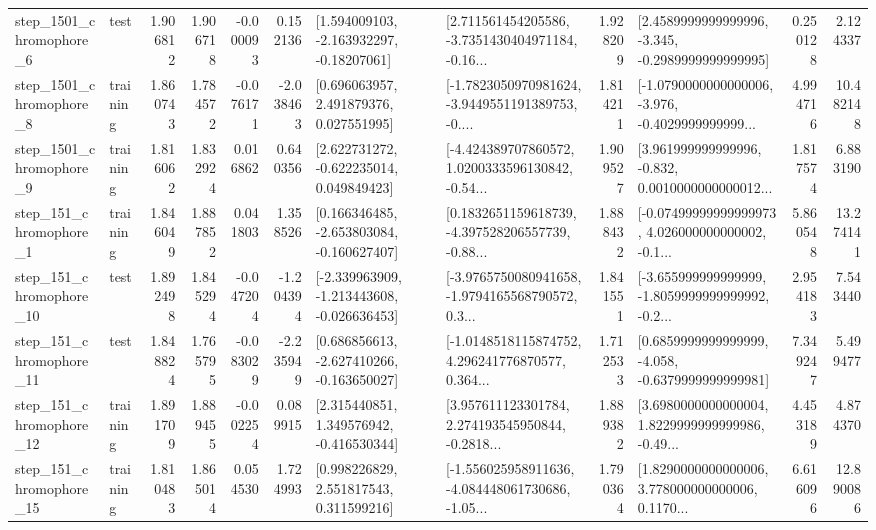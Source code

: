 \begin{tabular}{llrrrrllrlrr}
  step\_1501\_chromophore\_6 &      test &      1.906812 &    1.906718 &     -0.000093 &  0.152136 &    [1.594009103, -2.163932297, -0.18207061] &  [2.711561454205586, -3.7351430404971184, -0.16... &       1.928209 &  [2.4589999999999996, -3.345, -0.2989999999999995] &            0.250128 &          2.124337 \\
  step\_1501\_chromophore\_8 &  training &      1.860743 &    1.784572 &     -0.076171 & -2.038463 &     [0.696063957, 2.491879376, 0.027551995] &  [-1.7823050970981624, -3.9449551191389753, -0.... &       1.814211 &  [-1.0790000000000006, -3.976, -0.4029999999999... &            4.994716 &         10.482148 \\
  step\_1501\_chromophore\_9 &  training &      1.816062 &    1.832924 &      0.016862 &  0.640356 &    [2.622731272, -0.622235014, 0.049849423] &  [-4.424389707860572, 1.0200333596130842, -0.54... &       1.909527 &  [3.961999999999996, -0.832, 0.0010000000000012... &            1.817574 &          6.883190 \\
   step\_151\_chromophore\_1 &  training &      1.846049 &    1.887852 &      0.041803 &  1.358526 &   [0.166346485, -2.653803084, -0.160627407] &  [0.1832651159618739, -4.397528206557739, -0.88... &       1.888432 &  [-0.07499999999999973, 4.026000000000002, -0.1... &            5.860548 &         13.274141 \\
  step\_151\_chromophore\_10 &      test &      1.892498 &    1.845294 &     -0.047204 & -1.204394 &  [-2.339963909, -1.213443608, -0.026636453] &  [-3.9765750080941658, -1.9794165568790572, 0.3... &       1.841551 &  [-3.655999999999999, -1.8059999999999992, -0.2... &            2.954183 &          7.543440 \\
  step\_151\_chromophore\_11 &      test &      1.848824 &    1.765795 &     -0.083029 & -2.235949 &   [0.686856613, -2.627410266, -0.163650027] &  [-1.0148518115874752, 4.296241776870577, 0.364... &       1.712533 &  [0.6859999999999999, -4.058, -0.6379999999999981] &            7.349247 &          5.499477 \\
  step\_151\_chromophore\_12 &  training &      1.891709 &    1.889455 &     -0.002254 &  0.089915 &    [2.315440851, 1.349576942, -0.416530344] &  [3.957611123301784, 2.274193545950844, -0.2818... &       1.889382 &  [3.6980000000000004, 1.8229999999999986, -0.49... &            4.453189 &          4.874370 \\
  step\_151\_chromophore\_15 &  training &      1.810483 &    1.865014 &      0.054530 &  1.724993 &     [0.998226829, 2.551817543, 0.311599216] &  [-1.556025958911636, -4.084448061730686, -1.05... &       1.790364 &  [1.8290000000000006, 3.778000000000006, 0.1170... &            6.616096 &         12.890086 \\

\end{tabular}
